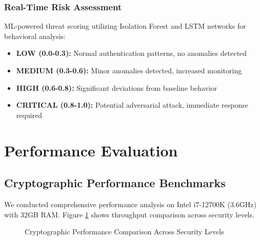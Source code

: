 \documentclass[12pt,a4paper]{article}
\begin{document}
\subsubsection{Real-Time Risk Assessment}

ML-powered threat scoring utilizing Isolation Forest \cite{liu2008isolation} and LSTM networks \cite{hochreiter1997long} for behavioral analysis:

\begin{itemize}
    \item \textbf{LOW (0.0-0.3):} Normal authentication patterns, no anomalies detected
    \item \textbf{MEDIUM (0.3-0.6):} Minor anomalies detected, increased monitoring
    \item \textbf{HIGH (0.6-0.8):} Significant deviations from baseline behavior
    \item \textbf{CRITICAL (0.8-1.0):} Potential adversarial attack, immediate response required
\end{itemize}

\section{Performance Evaluation}

\subsection{Cryptographic Performance Benchmarks}

We conducted comprehensive performance analysis on Intel i7-12700K (3.6GHz) with 32GB RAM. Figure \ref{fig:crypto_performance} shows throughput comparison across security levels.

\begin{figure}[H]
\centering
{}
\caption{Cryptographic Performance Comparison Across Security Levels}
\label{fig:crypto_performance}
\end{figure}
\end{document}
